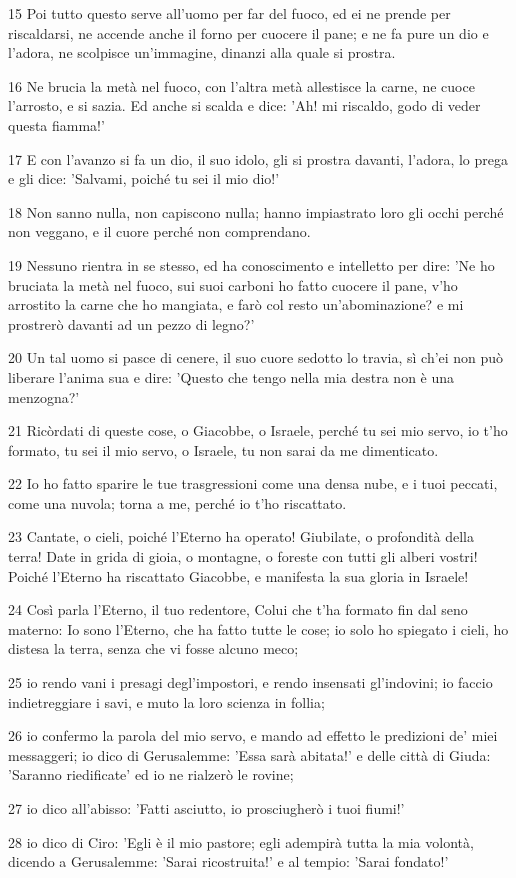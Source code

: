 \par 15 Poi tutto questo serve all'uomo per far del fuoco, ed ei ne prende per riscaldarsi, ne accende anche il forno per cuocere il pane; e ne fa pure un dio e l'adora, ne scolpisce un'immagine, dinanzi alla quale si prostra.
\par 16 Ne brucia la metà nel fuoco, con l'altra metà allestisce la carne, ne cuoce l'arrosto, e si sazia. Ed anche si scalda e dice: 'Ah! mi riscaldo, godo di veder questa fiamma!'
\par 17 E con l'avanzo si fa un dio, il suo idolo, gli si prostra davanti, l'adora, lo prega e gli dice: 'Salvami, poiché tu sei il mio dio!'
\par 18 Non sanno nulla, non capiscono nulla; hanno impiastrato loro gli occhi perché non veggano, e il cuore perché non comprendano.
\par 19 Nessuno rientra in se stesso, ed ha conoscimento e intelletto per dire: 'Ne ho bruciata la metà nel fuoco, sui suoi carboni ho fatto cuocere il pane, v'ho arrostito la carne che ho mangiata, e farò col resto un'abominazione? e mi prostrerò davanti ad un pezzo di legno?'
\par 20 Un tal uomo si pasce di cenere, il suo cuore sedotto lo travia, sì ch'ei non può liberare l'anima sua e dire: 'Questo che tengo nella mia destra non è una menzogna?'
\par 21 Ricòrdati di queste cose, o Giacobbe, o Israele, perché tu sei mio servo, io t'ho formato, tu sei il mio servo, o Israele, tu non sarai da me dimenticato.
\par 22 Io ho fatto sparire le tue trasgressioni come una densa nube, e i tuoi peccati, come una nuvola; torna a me, perché io t'ho riscattato.
\par 23 Cantate, o cieli, poiché l'Eterno ha operato! Giubilate, o profondità della terra! Date in grida di gioia, o montagne, o foreste con tutti gli alberi vostri! Poiché l'Eterno ha riscattato Giacobbe, e manifesta la sua gloria in Israele!
\par 24 Così parla l'Eterno, il tuo redentore, Colui che t'ha formato fin dal seno materno: Io sono l'Eterno, che ha fatto tutte le cose; io solo ho spiegato i cieli, ho distesa la terra, senza che vi fosse alcuno meco;
\par 25 io rendo vani i presagi degl'impostori, e rendo insensati gl'indovini; io faccio indietreggiare i savi, e muto la loro scienza in follia;
\par 26 io confermo la parola del mio servo, e mando ad effetto le predizioni de' miei messaggeri; io dico di Gerusalemme: 'Essa sarà abitata!' e delle città di Giuda: 'Saranno riedificate' ed io ne rialzerò le rovine;
\par 27 io dico all'abisso: 'Fatti asciutto, io prosciugherò i tuoi fiumi!'
\par 28 io dico di Ciro: 'Egli è il mio pastore; egli adempirà tutta la mia volontà, dicendo a Gerusalemme: 'Sarai ricostruita!' e al tempio: 'Sarai fondato!'


